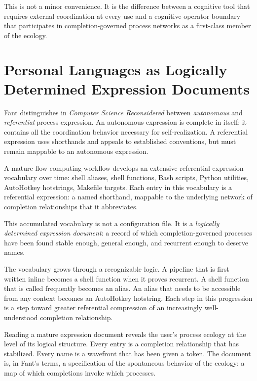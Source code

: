 \documentclass[12pt, a4paper]{article}
\begin{document}
This is not a minor convenience. It is the difference between a
cognitive tool that requires external coordination at every use and
a cognitive operator boundary that participates in completion-governed
process networks as a first-class member of the ecology.

\section{Personal Languages as Logically Determined Expression Documents}

Fant distinguishes in \textit{Computer Science Reconsidered} between
\emph{autonomous} and \emph{referential} process expression. An
autonomous expression is complete in itself: it contains all the
coordination behavior necessary for self-realization. A referential
expression uses shorthands and appeals to established conventions,
but must remain mappable to an autonomous expression.

A mature flow computing workflow develops an extensive referential
expression vocabulary over time: shell aliases, shell functions,
Bash scripts, Python utilities, AutoHotkey hotstrings, Makefile
targets. Each entry in this vocabulary is a referential expression:
a named shorthand, mappable to the underlying network of completion
relationships that it abbreviates.

This accumulated vocabulary is not a configuration file. It is a
\emph{logically determined expression document}: a record of which
completion-governed processes have been found stable enough, general
enough, and recurrent enough to deserve names.

The vocabulary grows through a recognizable logic. A pipeline that is
first written inline becomes a shell function when it proves
recurrent. A shell function that is called frequently becomes an
alias. An alias that needs to be accessible from any context becomes
an AutoHotkey hotstring. Each step in this progression is a step
toward greater referential compression of an increasingly well-
understood completion relationship.

Reading a mature expression document reveals the user's process
ecology at the level of its logical structure. Every entry is a
completion relationship that has stabilized. Every name is a
wavefront that has been given a token. The document is, in Fant's
terms, a specification of the spontaneous behavior of the ecology:
a map of which completions invoke which processes.
\end{document}
